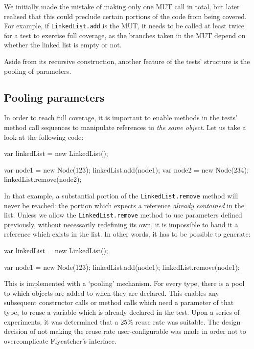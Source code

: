 We initially made the mistake of making only one MUT call in total, but later realised that this could preclude certain portions of the code from being covered. For example, if \texttt{LinkedList.add} is the MUT, it needs to be called at least twice for a test to exercise full coverage, as the branches taken in the MUT depend on whether the linked list is empty or not.

Aside from its recursive construction, another feature of the tests' structure is the pooling of parameters.

\subsection{Pooling parameters}
In order to reach full coverage, it is important to enable methods in the tests' method call sequences to manipulate references to \emph{the same object}. Let us take a look at the following code:

\begin{code}[caption=Unreachable code,label=unreachable]
var linkedList = new LinkedList();

var node1 = new Node(123);
linkedList.add(node1);
var node2 = new Node(234);
linkedList.remove(node2);
\end{code}

In that example, a substantial portion of the \texttt{LinkedList.remove} method will never be reached: the portion which expects a reference \emph{already contained} in the list. Unless we allow the \texttt{LinkedList.remove} method to use parameters defined previously, without necessarily redefining its own, it is impossible to hand it a reference which exists in the list. In other words, it has to be possible to generate:

\begin{code}[caption=Pooling,label=pooling]
var linkedList = new LinkedList();

var node1 = new Node(123);
linkedList.add(node1);
linkedList.remove(node1);
\end{code}

This is implemented with a `pooling' mechanism. For every type, there is a pool to which objects are added to when they are declared. This enables any subsequent constructor calls or method calls which need a parameter of that type, to reuse a variable which is already declared in the test. Upon a series of experiments, it was determined that a 25\% reuse rate was suitable. The design decision of not making the reuse rate user-configurable was made in order not to overcomplicate \textsf{Flycatcher}'s interface.

